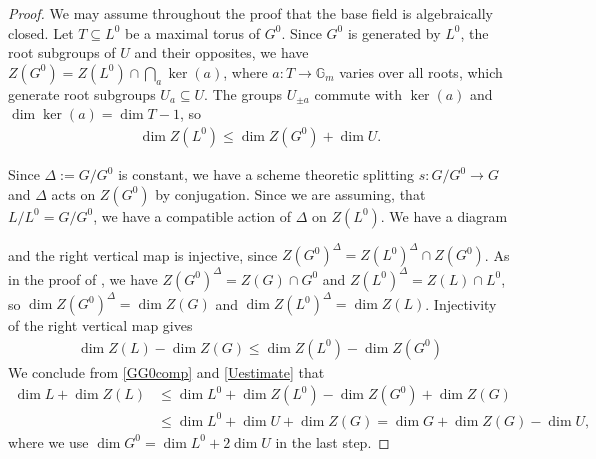 \documentclass{amsart}
\theoremstyle{definition}
\theoremstyle{remark}
\newcommand{\Gm}{\mathbb G_{m}}
\begin{document}
\begin{proof} 
    We may assume throughout the proof that the base field is algebraically closed.
    Let $T \subseteq L^0$ be a maximal torus of $G^0$.
    Since $G^0$ is generated by $L^0$, the root subgroups of $U$ and their opposites, we have $Z(G^0) = Z(L^0) \cap \bigcap_a \ker(a)$, where $a : T \to \Gm$ varies over all roots, which generate root subgroups $U_a \subseteq U$. The groups $U_{\pm a}$ commute with $\ker(a)$ and $\dim \ker(a) = \dim T - 1$, so
    \begin{align}
        \dim Z(L^0) \leq \dim Z(G^0) + \dim U. \label{Uestimate}
    \end{align}
    
    Since $\Delta := G/G^0$ is constant, we have a scheme theoretic splitting $s : G/G^0 \to G$ and $\Delta$ acts on $Z(G^0)$ by conjugation. 
    Since we are assuming, that $L/L^0 = G/G^0$, we have a compatible action of $\Delta$ on $Z(L^0)$. We have a diagram
    \begin{center}
    \end{center}
    and the right vertical map is injective, since $Z(G^0)^{\Delta} = Z(L^0)^{\Delta} \cap Z(G^0)$.
    As in the proof of , we have $Z(G^0)^{\Delta} = Z(G) \cap G^0$ and $Z(L^0)^{\Delta} = Z(L) \cap L^0$, so $\dim Z(G^0)^{\Delta} = \dim Z(G)$ and $\dim Z(L^0)^{\Delta} = \dim Z(L)$. Injectivity of the right vertical map gives
    \begin{align}
        \dim Z(L) - \dim Z(G) \leq \dim Z(L^0) - \dim Z(G^0) \label{GG0comp}
    \end{align}
    We conclude from \eqref{GG0comp} and \eqref{Uestimate} that 
    \begin{align*}
        \dim L + \dim Z(L) &\leq \dim L^0 + \dim Z(L^0) - \dim Z(G^0) + \dim Z(G) \\
         &\leq \dim L^0 + \dim U + \dim Z(G) 
         = \dim G + \dim Z(G) - \dim U,
    \end{align*}
    where we use $\dim G^0 = \dim L^0 + 2 \dim U$ in the last step.
\end{proof}
\end{document}

